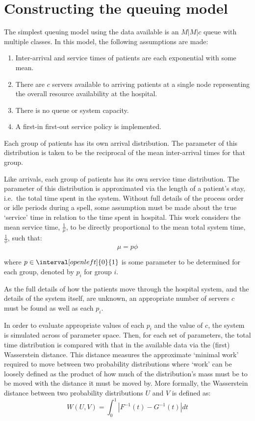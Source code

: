 \section{Constructing the queuing model}\label{sec:wasserstein}

The simplest queuing model using the data available is an \(M|M|c\) queue with
multiple classes. In this model, the following assumptions are made:
\begin{enumerate}
    \item Inter-arrival and service times of patients are each exponential with
        some mean.
    \item There are $c$ servers available to arriving patients at a single node
        representing the overall resource availability at the hospital.
    \item There is no queue or system capacity.
    \item A first-in first-out service policy is implemented.
\end{enumerate}

Each group of patients has its own arrival distribution. The parameter of this
distribution is taken to be the reciprocal of the mean inter-arrival times for
that group.

Like arrivals, each group of patients has its own service time distribution.
The parameter of this distribution is approximated via the length of a patient's
stay, i.e.\ the total time spent in the system. Without full details of the
process order or idle periods during a spell, some assumption must be made about
the true `service' time in relation to the time spent in hospital. This work
considers the mean service time, \(\frac{1}{\mu}\), to be directly proportional
to the mean total system time, \(\frac{1}{\phi}\), such that:
\begin{equation}
    \mu = p \phi
\end{equation}

\noindent where \(p \in \interval[open left]{0}{1}\) is some parameter to be
determined for each group, denoted by \(p_i\) for group \(i\).

As the full details of how the patients move through the hospital system, and
the details of the system itself, are unknown, an appropriate number of servers
\(c\) must be found as well as each \(p_i\).

In order to evaluate appropriate values of each \(p_i\) and the value of \(c\),
the system is simulated across of parameter space. Then, for each set of
parameters, the total time distribution is compared with that in the available
data via the (first) Wasserstein distance. This distance measures the
approximate `minimal work' required to move between two probability
distributions where `work' can be loosely defined as the product of how much of
the distribution's mass must be to be moved with the distance it must be moved
by. More formally, the Wasserstein distance between two probability
distributions \(U\) and \(V\) is defined as:
\begin{equation}\label{eq:wasserstein}
    W(U, V) = \int_{0}^{1} \left\vert F^{-1}(t) - G^{-1}(t) \right\vert dt
\end{equation}

